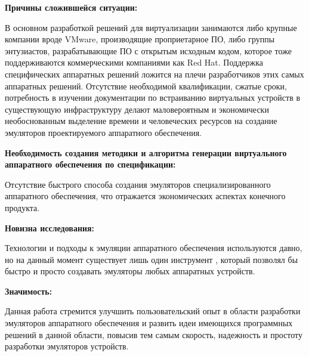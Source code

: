 \textbf{Причины сложившейся ситуации:}

В основном разработкой решений для виртуализации занимаются либо крупные компании вроде VMware, производящие
проприетарное ПО, либо группы энтузиастов, разрабатывающие ПО с открытым исходным кодом, которое
тоже поддерживаются коммерческими компаниями как Red Hat. Поддержка специфических аппаратных решений
ложится на плечи разработчиков этих самых аппаратных решений. Отсутствие необходимой квалификации,
сжатые сроки, потребность в изучении документации по встраиванию виртуальных устройств в существующую
инфраструктуру делают маловероятным и экономически необоснованным выделение времени и
человеческих ресурсов на создание эмуляторов проектируемого аппаратного обеспечения.

\textbf{Необходимость создания методики и алгоритма генерации виртуального аппаратного
обеспечения по спецификации:}

Отсутствие быстрого способа создания эмуляторов специализированного аппаратного обеспечения, что отражается
экономических аспектах конечного продукта.

\textbf{Новизна исследования:}

Технологии и подходы к эмуляции аппаратного обеспечения используются давно,
но на данный момент существует лишь один инструмент \cite{imposters}, который позволял
бы быстро и просто создавать эмуляторы любых аппаратных устройств.


\textbf{Значимость:}

Данная работа стремится улучшить пользовательский опыт в области разработки эмуляторов
аппаратного обеспечения и развить идеи имеющихся программных решений в данной области,
повысив тем самым скорость, надежность и простоту разработки эмуляторов устройств.
